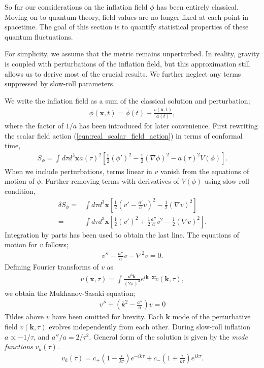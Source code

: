 So far our considerations on the inflation field $\phi$ has been entirely classical. Moving on to quantum theory, field values are no longer fixed at each point in spacetime. The goal of this section is to quantify statistical properties of these quantum fluctuations.

For simplicity, we assume that the metric remains unperturbed. In reality, gravity is coupled with perturbations of the inflation field, but this approximation still allows us to derive most of the crucial results. We further neglect any terms suppressed by slow-roll parameters.

We write the inflation field as a sum of the classical solution and perturbation;
\begin{align}
	\phi(\mathbf{x}, t) = \bar{\phi}(t) + \frac{v(\mathbf{x}, t)}{a(t)},
\end{align}
where the factor of $1/a$ has been introduced for later convenience. First rewriting the scalar field action (\ref{eqn:real_scalar_field_action}) in terms of conformal time,
\begin{align}
	S_\phi = \int d\tau d^3\mathbf{x} a(\tau)^2 \left[ \frac{1}{2} (\phi')^2 - \frac{1}{2}(\nabla\phi)^2 - a(\tau)^2 V(\phi) \right].
\end{align}
When we include perturbations, terms linear in $v$ vanish from the equations of motion of $\bar\phi$. Further removing terms with derivatives of $V(\phi)$ using slow-roll condition,
\begin{align}
	\delta S_\phi =& \int d\tau d^3\mathbf{x} \left[ \frac{1}{2} \left(v' - \frac{a'}{a}v \right)^2 - \frac{1}{2}(\nabla v)^2 \right]	\\
	=& \int d\tau d^3\mathbf{x} \left[ \frac{1}{2} (v')^2 + \frac{1}{2}\frac{a''}{a} v^2 - \frac{1}{2}(\nabla v)^2 \right].
\end{align}
Integration by parts has been used to obtain the last line. The equations of motion for $v$ follows;
\begin{align}
	v'' - \frac{a''}{a} v - \nabla^2 v = 0.
\end{align}
Defining Fourier transforms of $v$ as
\begin{align}
	v(\mathbf{x},\tau) = \int \frac{d^3 \mathbf{k}}{(2\pi)^3} e^{i\mathbf{k} \cdot \mathbf{x}} \tilde{v}(\mathbf{k},\tau),
\end{align}
we obtain the Mukhanov-Sasaki equation;
\begin{align}
	v'' + (k^2 - \frac{a''}{a})v = 0	\label{eqn:Mukhanov_Sasaki}
\end{align}
Tildes above $v$ have been omitted for brevity. Each $\mathbf{k}$ mode of the perturbative field $v(\mathbf{k},\tau)$ evolves independently from each other. During slow-roll inflation $a\propto-1/\tau$, and $a''/a = 2/\tau^2$. General form of the solution is given by the \textit{mode functions} $v_k(\tau)$.
\begin{align}
	v_k(\tau) = c_+ \left( 1 - \frac{i}{k\tau} \right) e^{-ik\tau} + c_- \left( 1 + \frac{i}{k\tau} \right) e^{ik\tau}.
\end{align}

